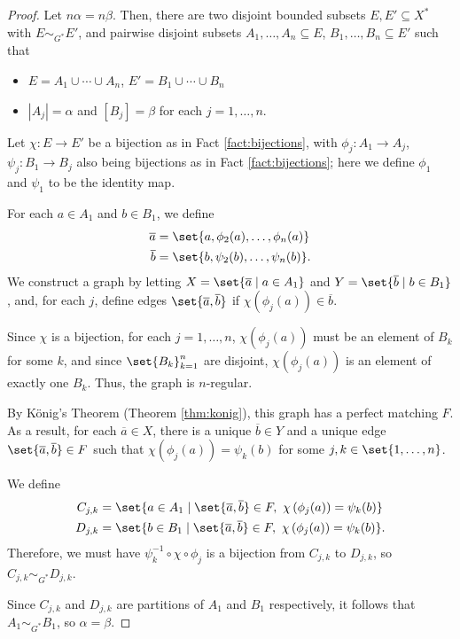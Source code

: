 \begin{proof}
  Let $n\alpha = n\beta$. Then, there are two disjoint bounded subsets $E,E'\subseteq X^{\ast}$ with $E\sim_{G^{\ast}}E'$, and pairwise disjoint subsets $A_1,\dots,A_n\subseteq E$, $B_1,\dots,B_n\subseteq E'$ such that
  \begin{itemize}
    \item $E = A_1\cup\cdots\cup A_n$, $E' = B_1\cup\cdots\cup B_n$
    \item $\left\vert A_j \right\vert = \alpha$ and $\left[B_j\right] = \beta$ for each $j=1,\dots,n$.
  \end{itemize}
  Let $\chi: E\rightarrow E'$ be a bijection as in Fact \ref{fact:bijections}, with $\phi_j: A_1\rightarrow A_j$, $\psi_j: B_1\rightarrow B_j$ also being bijections as in Fact \ref{fact:bijections}; here we define $\phi_1$ and $\psi_1$ to be the identity map.\newline

  For each $a\in A_1$ and $b\in B_1$, we define
  \begin{align*}
    \overline{a} &= \set{a,\phi_2(a),\dots,\phi_n(a)}\\
    \overline{b} &= \set{b,\psi_2(b),\dots,\psi_n(b)}.
  \end{align*}
  We construct a graph by letting $X = \set{\overline{a}\mid a\in A_1}$ and $Y = \set{\overline{b}\mid b\in B_1}$, and, for each $j$, define edges $\set{\overline{a},\overline{b}}$ if $\chi\left(\phi_j(a)\right)\in \overline{b}$.\newline

  Since $\chi$ is a bijection, for each $j=1,\dots,n$, $\chi\left(\phi_j(a)\right)$ must be an element of $B_k$ for some $k$, and since $\set{B_k}_{k=1}^{n}$ are disjoint, $\chi\left(\phi_j(a)\right)$ is an element of exactly one $B_k$. Thus, the graph is $n$-regular.\newline

  By König's Theorem (Theorem \ref{thm:konig}), this graph has a perfect matching $F$. As a result, for each $\overline{a}\in X$, there is a unique $\overline{b}\in Y$ and a unique edge $\set{\overline{a},\overline{b}}\in F$ such that $\chi\left(\phi_j(a)\right) = \psi_k(b)$ for some $j,k\in \set{1,\dots,n}$.\newline

  We define
  \begin{align*}
    C_{j,k} &= \set{a\in A_1\mid \set{\overline{a},\overline{b}}\in F,~\chi\left(\phi_j(a)\right) = \psi_k(b)}\\
    D_{j,k} &= \set{b\in B_1\mid \set{\overline{a},\overline{b}}\in F,~\chi\left(\phi_j(a)\right) = \psi_k(b)}.
  \end{align*}
  Therefore, we must have $\psi_{k}^{-1}\circ \chi\circ \phi_j$ is a bijection from $C_{j,k}$ to $D_{j,k}$, so $C_{j,k}\sim_{G^{\ast}}D_{j,k}$.\newline

  Since $C_{j,k}$ and $D_{j,k}$ are partitions of $A_1$ and $B_1$ respectively, it follows that $A_1\sim_{G^{\ast}}B_1$, so $\alpha = \beta$.
\end{proof}
